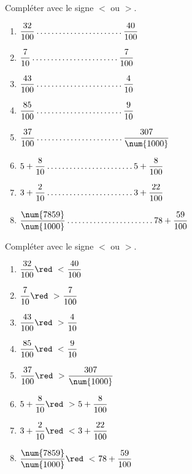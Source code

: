 \begin{exercice}
    Compléter avec le signe $<$ ou $>$. \medskip
    \begin{multicols}{2}
        \begin{spacing}{2}
            \begin{enumerate}
                \item $\dfrac{32}{100}                  \makebox[0.3\linewidth]{\dotfill} \dfrac{40}{100}$ 
                \item $\dfrac{7}{10}                    \makebox[0.3\linewidth]{\dotfill} \dfrac{7}{100}$ 
                \item $\dfrac{43}{100}                  \makebox[0.3\linewidth]{\dotfill} \dfrac{4}{10}$ 
                \item $\dfrac{85}{100}                  \makebox[0.3\linewidth]{\dotfill} \dfrac{9}{10}$
                \item $\dfrac{37}{100}                  \makebox[0.3\linewidth]{\dotfill} \dfrac{307}{\num{1000}}$
                \item $5+\dfrac{8}{10}                  \makebox[0.3\linewidth]{\dotfill} 5+\dfrac{8}{100}$
                \item $3+\dfrac{2}{10}                  \makebox[0.3\linewidth]{\dotfill} 3+\dfrac{22}{100}$
                \item $\dfrac{\num{7859}}{\num{1000}}   \makebox[0.3\linewidth]{\dotfill} 78+\dfrac{59}{100}$
            \end{enumerate}
        \end{spacing}
    \end{multicols}
 \end{exercice}
 
 \begin{corrige}
    Compléter avec le signe $<$ ou $>$. \medskip

    \begin{multicols}{2}
        \begin{spacing}{1.5}
            \begin{enumerate}
                \item $\dfrac{32}{100}                  {\red~<~} \dfrac{40}{100}$ 
                \item $\dfrac{7}{10}                    {\red~>~} \dfrac{7}{100}$ 
                \item $\dfrac{43}{100}                  {\red~>~} \dfrac{4}{10}$ 
                \item $\dfrac{85}{100}                  {\red~<~} \dfrac{9}{10}$
                \item $\dfrac{37}{100}                  {\red~>~} \dfrac{307}{\num{1000}}$
                \item $5+\dfrac{8}{10}                  {\red~>~} 5+\dfrac{8}{100}$
                \item $3+\dfrac{2}{10}                  {\red~<~} 3+\dfrac{22}{100}$
                \item $\dfrac{\num{7859}}{\num{1000}}   {\red~<~} 78+\dfrac{59}{100}$
            \end{enumerate}
        \end{spacing}
    \end{multicols}
\end{corrige}